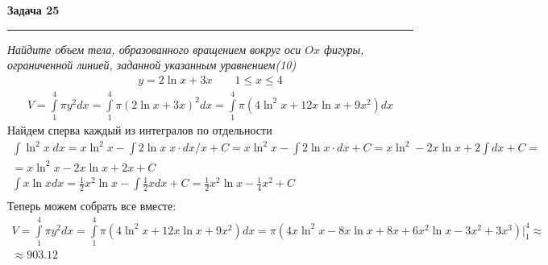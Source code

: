 \documentclass[a4paper,11pt]{article}
\begin{document}
\textbf{\large Задача 25}
\medskip\hrule\medskip
\textit{Найдите объем тела, образованного вращением вокруг оси $ Ox $ фигуры, ограниченной линией, заданной указанным уравнением(10)}
\begin{align*}
y = 2 \ln x + 3x \qquad 1 \leq x \leq 4 
\end{align*}
\begin{gather*}
V = \int\limits_{1}^{4} \pi y^2 dx =
\int\limits_{1}^{4} \pi (2 \ln x + 3x)^2 dx = 
\int\limits_{1}^{4} \pi (4 \ln^2x + 12 x\ln x + 9x^2)dx
\end{gather*}
Найдем сперва каждый из интегралов по отдельности
\begin{gather*}
\int \ln^2 x \; dx = 
x\ln^2 x - \int 2\ln x \; x \cdot dx/x + C = 
x\ln^2 x - \int 2\ln x\cdot dx + C = 
x\ln^2 - 2x\ln x  + 2 \int dx + C =\\[2pt] 
= x\ln^2 x - 2x\ln x + 2x + C\\[5pt]
\int x \ln x dx = \frac12 x^2 \ln x - \int \frac12xdx + C =
\frac12 x^2 \ln x - \frac14x^2 + C\\[5pt]
\end{gather*}
Теперь можем собрать все вместе:
\begin{gather*}
V = \int\limits_{1}^{4} \pi y^2 dx = 
\int\limits_{1}^{4} \pi (4 \ln^2x + 12 x\ln x + 9x^2)dx = 
\pi (4x\ln^2 x - 8x\ln x + 8x + 6x^2 \ln x - 3x^2 + 3x^3) \big |_{1}^{4} \approx\\
\approx 903.12
\end{gather*}
\\ \\ \\ 



\end{document}
